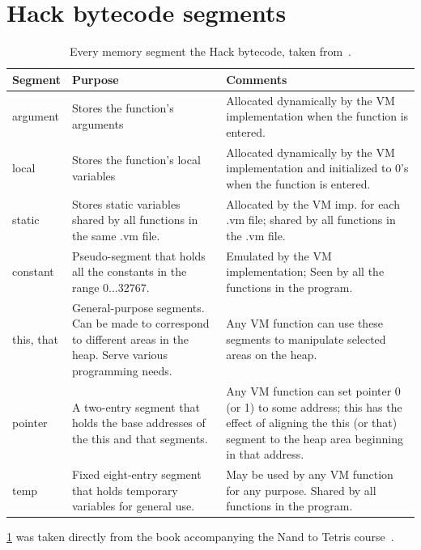 \section{Hack bytecode segments}
\begin{table}[ht]
  \begin{center}
    \centering
    \begin{tabularx}{\textwidth}{|l|X|X|}
      \toprule
      Segment        & Purpose              & Comments \\ \midrule
      argument     & Stores the function's arguments    & Allocated dynamically by the VM implementation when the function is entered.  \\ \midrule
      local     & Stores the function's local variables  & Allocated dynamically by the VM implementation and initialized to 0’s when the function is entered.  \\ \midrule
      static     & Stores static variables shared by all functions in the same .vm ﬁle.  & Allocated by the VM imp. for each .vm ﬁle; shared by all functions in the .vm ﬁle.  \\ \midrule
      constant     & Pseudo-segment that holds all the constants in the range 0...32767.  & Emulated by the VM implementation; Seen by all the functions in the program.  \\ \midrule
      this, that     & General-purpose segments. Can be made to correspond to different areas in the heap. Serve various programming needs.  & Any VM function can use these segments to manipulate selected areas on the heap.  \\ \midrule
      pointer     & A two-entry segment that holds the base addresses of the this and that segments.  & Any VM function can set pointer 0 (or 1) to some address; this has the effect of aligning the this (or that) segment to the heap area beginning in that address.  \\ \midrule
      temp     & Fixed eight-entry segment that holds temporary variables for general use.  & May be used by any VM function for any purpose. Shared by all functions in the program.  \\
      \bottomrule
    \end{tabularx}
    \caption{Every memory segment the Hack bytecode, taken from~\cite{nisan2005}.}
    \label{table:segments}
  \end{center}
\end{table}

\cref{table:segments} was taken directly from the book accompanying the Nand to Tetris course~\cite{nisan2005}.

